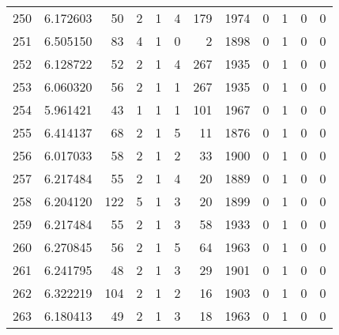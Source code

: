 \begin{tabular}{lrrrrrrrrrrr}
250 &  6.172603 &   50 &      2 &        1 &      4 &             179 &  1974 &               0 &               1 &               0 &               0 \\
251 &  6.505150 &   83 &      4 &        1 &      0 &               2 &  1898 &               0 &               1 &               0 &               0 \\
252 &  6.128722 &   52 &      2 &        1 &      4 &             267 &  1935 &               0 &               1 &               0 &               0 \\
253 &  6.060320 &   56 &      2 &        1 &      1 &             267 &  1935 &               0 &               1 &               0 &               0 \\
254 &  5.961421 &   43 &      1 &        1 &      1 &             101 &  1967 &               0 &               1 &               0 &               0 \\
255 &  6.414137 &   68 &      2 &        1 &      5 &              11 &  1876 &               0 &               1 &               0 &               0 \\
256 &  6.017033 &   58 &      2 &        1 &      2 &              33 &  1900 &               0 &               1 &               0 &               0 \\
257 &  6.217484 &   55 &      2 &        1 &      4 &              20 &  1889 &               0 &               1 &               0 &               0 \\
258 &  6.204120 &  122 &      5 &        1 &      3 &              20 &  1899 &               0 &               1 &               0 &               0 \\
259 &  6.217484 &   55 &      2 &        1 &      3 &              58 &  1933 &               0 &               1 &               0 &               0 \\
260 &  6.270845 &   56 &      2 &        1 &      5 &              64 &  1963 &               0 &               1 &               0 &               0 \\
261 &  6.241795 &   48 &      2 &        1 &      3 &              29 &  1901 &               0 &               1 &               0 &               0 \\
262 &  6.322219 &  104 &      2 &        1 &      2 &              16 &  1903 &               0 &               1 &               0 &               0 \\
263 &  6.180413 &   49 &      2 &        1 &      3 &              18 &  1963 &               0 &               1 &               0 &               0 \\

\end{tabular}
